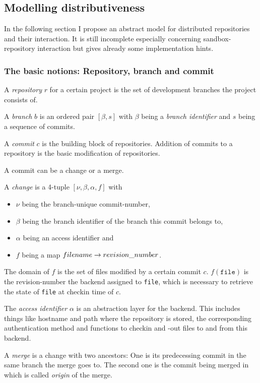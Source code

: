 \documentclass[fleqn, 10pt, a4paper]{article}
\begin{document}
\subsection{Modelling distributiveness}

In the following section I propose an abstract model for distributed
repositories and their interaction. It is still incomplete
especially concerning sandbox-repository interaction but gives already
some implementation hints.

\subsubsection{The basic notions: Repository, branch and commit}

A \emph{repository} $r$ for a certain project is the set of development
branches the project consists of.

A \emph{branch} $b$ is an ordered pair $[\beta, s]$ with $\beta$ being
a \emph{branch identifier} and $s$ being
a sequence of commits.

A \emph{commit} $c$ is the building block of repositories.
Addition of commits to a repository is the basic modification
of repositories.

A commit can be a change or a merge.

A \emph{change} is a 4-tuple $[\nu, \beta, \alpha, f]$ with
\begin{itemize}
\item $\nu$ being the branch-unique commit-number,
\item $\beta$ being the branch identifier of the branch
this commit belongs to,
\item $\alpha$ being an access identifier and
\item $f$ being a map $\mathnormal{filename} \rightarrow
\mathnormal{revision\_number}$.
\end{itemize}

The domain of $f$ is the set of files modified by a certain
commit $c$. $f(\mathtt{file})$ is the revision-number the
backend assigned to \texttt{file}, which is necessary to
retrieve the state of \texttt{file} at checkin time of $c$.

The \emph{access identifier} $\alpha$ is an abstraction layer for the
backend. This includes things like hostname and path where the
repository is stored, the corresponding authentication method
and functions to checkin and -out files to and from this backend.

A \emph{merge} is a change with two ancestors:
One is its predecessing commit in the same branch the merge
goes to. The second one is the commit being merged in which is
called \emph{origin} of the merge.
\end{document}
